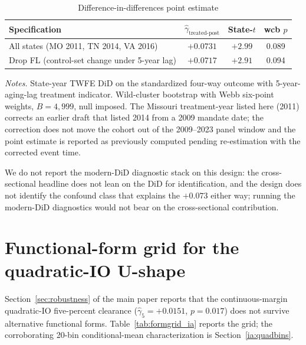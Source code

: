 \documentclass[12pt]{article}
\begin{document}
\begin{table}[h]
\centering
\caption{Difference-in-differences point estimate}
\label{tab:did_ia}
\footnotesize
\begin{tabular}{lccc}
\toprule
Specification & $\hat\gamma_{\text{treated-post}}$ & State-$t$ & wcb $p$ \\
\midrule
All states (MO 2011, TN 2014, VA 2016)             & $+0.0731$ & $+2.99$ & 0.089 \\
Drop FL (control-set change under 5-year lag)       & $+0.0717$ & $+2.91$ & 0.094 \\
\bottomrule
\end{tabular}

\medskip
{\footnotesize\textit{Notes.} State-year TWFE DiD on the standardized four-way outcome with 5-year-aging-lag treatment indicator. Wild-cluster bootstrap with Webb six-point weights, $B = 4{,}999$, null imposed. The Missouri treatment-year listed here (2011) corrects an earlier draft that listed 2014 from a 2009 mandate date; the correction does not move the cohort out of the 2009--2023 panel window and the point estimate is reported as previously computed pending re-estimation with the corrected event time.}
\end{table}

We do not report the modern-DiD diagnostic stack \citep{goodmanBacon2021, callawaySantanna2021, rambachanRoth2023} on this design: the cross-sectional headline does not lean on the DiD for identification, and the design does not identify the confound class that explains the $+0.073$ either way; running the modern-DiD diagnostics would not bear on the cross-sectional contribution.

\section{Functional-form grid for the quadratic-IO U-shape}
\label{ia:formgrid}

Section~\ref{sec:robustness} of the main paper reports that the continuous-margin quadratic-IO five-percent clearance ($\hat\gamma_{5} = +0.0151$, $p = 0.017$) does not survive alternative functional forms. Table~\ref{tab:formgrid_ia} reports the grid; the corroborating 20-bin conditional-mean characterization is Section~\ref{ia:quadbins}.
\end{document}

